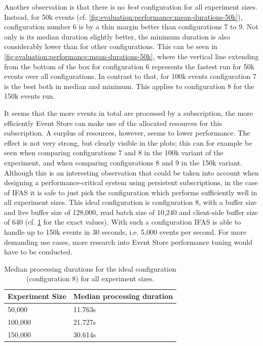 Another observation is that there is no \emph{best} configuration for all experiment sizes.
Instead, for 50k events (cf. \cref{fig:evaluation:performance:mean-durations-50k}), configuration number 6 is by a thin margin better than configurations 7 to 9.
Not only is its median duration slightly better, the minimum duration is also considerably lower than for other configurations.
This can be seen in \cref{fig:evaluation:performance:mean-durations-50k}, where the vertical line extending from the bottom of the box for configuration 6 represents the fastest run for 50k events over all configurations.
In contrast to that, for 100k events configuration 7 is the best both in median and minimum.
This applies to configuration 8 for the 150k events run.

It seems that the more events in total are processed by a subscription, the more efficiently Event Store can make use of the allocated resources for this subscription.
A surplus of resources, however, seems to lower performance.
The effect is not very strong, but clearly visible in the plots; this can for example be seen when comparing configurations 7 and 8 in the 100k variant of the experiment, and when comparing configurations 8 and 9 in the 150k variant.
Although this is an interesting observation that could be taken into account when designing a performance-critical system using persistent subscriptions, in the case of \ac{IFAS} it is safe to just pick the configuration which performs sufficiently well in all experiment sizes.
This ideal configuration is configuration 8, with a buffer size and live buffer size of 128,000, read batch size of 10,240 and client-side buffer size of 640 (cf. \cref{table:median-durations-config-8} for the exact values).
With such a configuration \ac{IFAS} is able to handle up to 150k events in 30 seconds, i.e. 5,000 events per second.
For more demanding use cases, more research into Event Store performance tuning would have to be conducted.


\begin{table}
\centering
\caption[Median processing durations for the ideal configuration for all experiment sizes.]
{Median processing durations for the ideal configuration (configuration 8) for all experiment sizes.}
\begin{tabular}{l|l}
\textbf{Experiment Size} & \textbf{Median processing duration} \\ \hline
50,000 & 11.763s \\
100,000 & 21.727s \\
150,000 & 30.614s
\end{tabular}
\label{table:median-durations-config-8}
\end{table}

